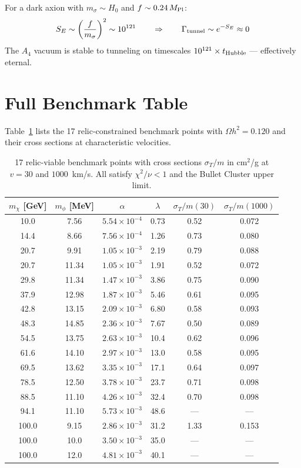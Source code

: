 \documentclass[12pt,a4paper]{article}
\newcommand{\sigmaT}{\sigma_T}
\begin{document}
For a dark axion with $m_\sigma \sim H_0$ and $f \sim 0.24\,M_{\rm Pl}$:
\begin{equation}
  S_E \sim \left(\frac{f}{m_\sigma}\right)^2 \sim 10^{121}
  \qquad \Rightarrow \qquad
  \Gamma_{\rm tunnel} \sim e^{-S_E} \approx 0
\end{equation}
The $A_4$ vacuum is stable to tunneling on timescales
$10^{121} \times t_{\rm Hubble}$ — effectively eternal.

\section{Full Benchmark Table}
\label{app:benchmarks_full}

Table~\ref{tab:full_bp} lists the 17 relic-constrained benchmark points
with $\Omega h^2 = 0.120$ and their cross sections at characteristic velocities.

\begin{table}[h!]
\centering
\caption{17 relic-viable benchmark points with cross sections $\sigmaT/m$ in
cm$^2$/g at $v = 30$ and $1000$~km/s. All satisfy $\chi^2/\nu < 1$ and the
Bullet Cluster upper limit.}
\label{tab:full_bp}
\begin{tabular}{cccccc}
\toprule
$m_\chi$ [GeV] & $m_\phi$ [MeV] & $\alpha$ & $\lambda$ &
  $\sigmaT/m(30)$ & $\sigmaT/m(1000)$ \\
\midrule
10.0  & 7.56  & $5.54\times10^{-4}$ & 0.73 & 0.52 & 0.072 \\
14.4  & 8.66  & $7.56\times10^{-4}$ & 1.26 & 0.73 & 0.080 \\
20.7  & 9.91  & $1.05\times10^{-3}$ & 2.19 & 0.79 & 0.088 \\
20.7  & 11.34 & $1.05\times10^{-3}$ & 1.91 & 0.52 & 0.072 \\
29.8  & 11.34 & $1.47\times10^{-3}$ & 3.86 & 0.75 & 0.090 \\
37.9  & 12.98 & $1.87\times10^{-3}$ & 5.46 & 0.61 & 0.095 \\
42.8  & 13.15 & $2.09\times10^{-3}$ & 6.80 & 0.58 & 0.093 \\
48.3  & 14.85 & $2.36\times10^{-3}$ & 7.67 & 0.50 & 0.089 \\
54.5  & 13.75 & $2.63\times10^{-3}$ & 10.4 & 0.62 & 0.096 \\
61.6  & 14.10 & $2.97\times10^{-3}$ & 13.0 & 0.58 & 0.095 \\
69.5  & 13.62 & $3.35\times10^{-3}$ & 17.1 & 0.64 & 0.097 \\
78.5  & 12.50 & $3.78\times10^{-3}$ & 23.7 & 0.71 & 0.098 \\
88.5  & 11.10 & $4.26\times10^{-3}$ & 32.4 & 0.70 & 0.098 \\
94.1  & 11.10 & $5.73\times10^{-3}$ & 48.6 & — & — \\
100.0 & 9.15  & $2.86\times10^{-3}$ & 31.2 & 1.33 & 0.153 \\
100.0 & 10.0  & $3.50\times10^{-3}$ & 35.0 & — & — \\
100.0 & 12.0  & $4.81\times10^{-3}$ & 40.1 & — & — \\
\bottomrule
\end{tabular}
\end{table}
\end{document}
